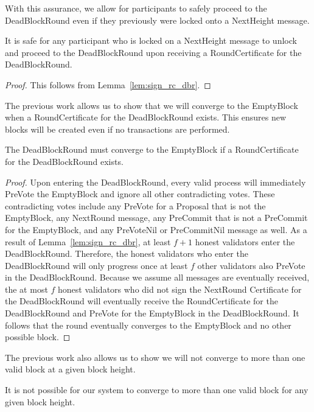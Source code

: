 With this assurance, we allow for participants to safely proceed to the
DeadBlockRound even if they previously were locked onto a NextHeight message.

\begin{lem}
\label{lem:safe_unlock_nh_dbr}
It is safe for any participant who is locked on a NextHeight message to unlock
and proceed to the DeadBlockRound upon receiving a RoundCertificate for the
DeadBlockRound.
\end{lem}

\begin{proof}
This follows from Lemma~\ref{lem:sign_rc_dbr}.
\end{proof}

The previous work allows us to show that we will converge to the EmptyBlock
when a RoundCertificate for the DeadBlockRound exists.
This ensures new blocks will be created even if no transactions are performed.

\begin{lem}
\label{lem:emptyblock_rc_dbr}
The DeadBlockRound must converge to the EmptyBlock if a RoundCertificate for
the DeadBlockRound exists.
\end{lem}

\begin{proof}
Upon entering the DeadBlockRound, every valid process will immediately PreVote
the EmptyBlock and ignore all other contradicting votes.
These contradicting votes include any PreVote for a Proposal that is not the
EmptyBlock, any NextRound message, any PreCommit that is not a PreCommit for
the EmptyBlock, and any PreVoteNil or PreCommitNil message as well.
As a result of Lemma~\ref{lem:sign_rc_dbr},
at least $f+1$ honest validators enter the DeadBlockRound.
Therefore, the honest validators who enter the DeadBlockRound will only
progress once at least $f$ other validators also PreVote in the DeadBlockRound.
Because we assume all messages are eventually received, the at most $f$ honest
validators who did not sign the NextRound Certificate for the DeadBlockRound
will eventually receive the RoundCertificate for the DeadBlockRound and PreVote
for the EmptyBlock in the DeadBlockRound.
It follows that the round eventually converges to the EmptyBlock and no other
possible block.
\end{proof}

The previous work also allows us to show we will not converge to more
than one valid block at a given block height.

\begin{lem}
It is not possible for our system to converge to more than one valid block for
any given block height.
\end{lem}

